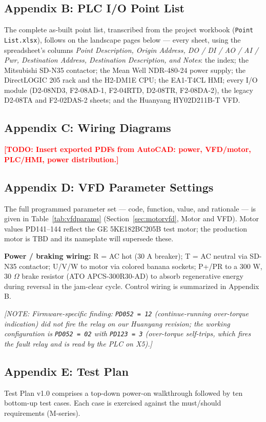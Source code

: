 \documentclass[hidelinks,12pt]{article}
\newcommand{\todo}[1]{\textcolor{red}{\textbf{[TODO: #1]}}}
\newcommand{\note}[1]{\textcolor{PSUblue}{\textit{[NOTE: #1]}}}
\begin{document}
\subsection{Appendix B: PLC I/O Point List}
The complete as-built point list, transcribed from the project workbook
(\texttt{Point List.xlsx}), follows on the landscape pages below --- every sheet, using
the spreadsheet's columns \emph{Point Description, Origin Address, DO / DI / AO / AI /
Pwr, Destination Address, Destination Description, and Notes}: the index; the Mitsubishi
SD-N35 contactor; the Mean Well NDR-480-24 power supply; the DirectLOGIC 205 rack and
the H2-DM1E CPU; the EA1-T4CL HMI; every I/O module (D2-08ND3, F2-08AD-1, F2-04RTD,
D2-08TR, F2-08DA-2), the legacy D2-08TA and F2-02DAS-2 sheets; and the Huanyang
HY02D211B-T VFD.



\subsection{Appendix C: Wiring Diagrams}
\todo{Insert exported PDFs from AutoCAD: power, VFD/motor, PLC/HMI, power distribution.}

\subsection{Appendix D: VFD Parameter Settings}
The full programmed parameter set --- code, function, value, and rationale --- is given
in Table~\ref{tab:vfdparams} (Section~\ref{sec:motorvfd}, Motor and VFD). Motor values
PD141--144 reflect the GE 5KE182BC205B test motor; the production motor is TBD and its
nameplate will supersede these.

\textbf{Power / braking wiring:} R = AC hot (30 A breaker); T = AC neutral via SD-N35
contactor; U/V/W to motor via colored banana sockets; P+/PR to a 300 W, 30 $\Omega$
brake resistor (ATO APCS-300R30-AD) to absorb regenerative energy during reversal in
the jam-clear cycle. Control wiring is summarized in Appendix B.

\note{Firmware-specific finding: \texttt{PD052 = 12} (continue-running over-torque
indication) did not fire the relay on our Huanyang revision; the working configuration
is \texttt{PD052 = 02} with \texttt{PD123 = 3} (over-torque self-trips, which fires the
fault relay and is read by the PLC on X5).}

\subsection{Appendix E: Test Plan}
Test Plan v1.0 comprises a top-down power-on walkthrough followed by ten bottom-up
test cases. Each case is exercised against the must/should requirements (M-series).
\end{document}
